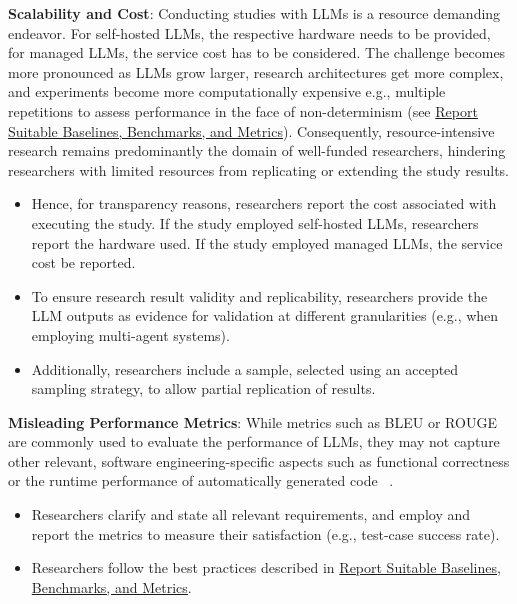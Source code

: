 \textbf{Scalability and Cost}:
Conducting studies with LLMs is a resource demanding endeavor. For self-hosted LLMs, the respective hardware needs to be provided, for managed LLMs, the service cost has to be considered. The challenge becomes more pronounced as LLMs grow larger, research architectures get more complex, and experiments become more computationally expensive e.g., multiple repetitions to assess performance in the face of non-determinism (see \href{/guidelines/report-baselines-benchmarks-and-metrics}{Report Suitable Baselines, Benchmarks, and Metrics}).
Consequently, resource-intensive research remains predominantly the domain of well-funded researchers, hindering researchers with limited resources from replicating or extending the study results.
\begin{itemize}
  \item Hence, for transparency reasons, researchers \should report the cost associated with executing the study. If the study employed self-hosted LLMs, researchers \should report the hardware used. If the study employed managed LLMs, the service cost \should be reported.
  \item To ensure research result validity and replicability, researchers \must provide the LLM outputs as evidence for validation at different granularities (e.g., when employing multi-agent systems). 
  \item Additionally, researchers \should include a sample, selected using an accepted sampling strategy, to allow partial replication of results.
\end{itemize}

\textbf{Misleading Performance Metrics}:
While metrics such as BLEU or ROUGE are commonly used to evaluate the performance of LLMs, they may not capture other relevant, software engineering-specific aspects such as functional correctness or the runtime performance of automatically generated code ~\cite{DBLP:conf/nips/LiuXW023}.
\begin{itemize}
  \item Researchers \should clarify and state all relevant requirements, and employ and report the metrics to measure their satisfaction (e.g., test-case success rate). 
  \item Researchers \should follow the best practices described in \href{/guidelines/report-baselines-benchmarks-and-metrics}{Report Suitable Baselines, Benchmarks, and Metrics}.
\end{itemize}

